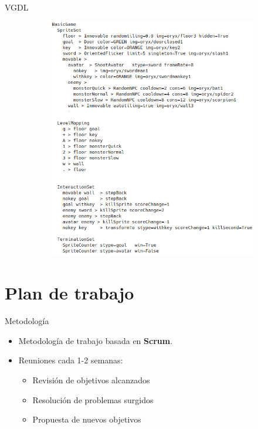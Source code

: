 \documentclass[11pt]{beamer}    %
\begin{document}
\begin{frame}{VGDL}
\begin{figure}
\begin{subfigure}{0.5\textwidth}
                \includegraphics[scale=0.4]{img/presentation/game_def}
            \end{subfigure}
        \end{figure}
    \end{frame}

    \section{Plan de trabajo}

    \begin{frame}{Metodología}
        \begin{itemize}
            \item Metodología de trabajo basada en \textbf{Scrum}.
            \item Reuniones cada 1-2 semanas:
                \begin{itemize}
                    \item Revisión de objetivos alcanzados
                    \item Resolución de problemas surgidos
                    \item Propuesta de nuevos objetivos
                \end{itemize}
        \end{itemize}
    \end{frame}
\end{document}
